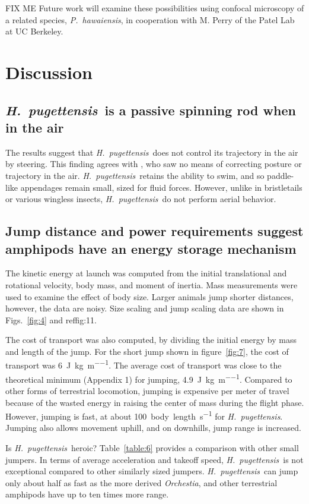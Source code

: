 \documentclass{article}
\newcommand{\Genus}[1]{\emph{#1}}
\newcommand{\Hyale}{\Genus{H.~pugettensis}}
\newcommand{\Parhyale}{\Genus{P.~hawaiensis}}
\begin{document}
FIX ME Future work will examine these possibilities using confocal microscopy of a related species, \Parhyale, in cooperation with M. Perry of the Patel Lab at UC Berkeley. 


\section*{Discussion}
\subsection*{\Hyale\ is a passive spinning rod when in the air}
	  The results suggest that \Hyale\ does not control its trajectory in the air by steering.  This finding agrees with \citet{Bracht:1980}, who saw no means of correcting posture or trajectory in the air.  \Hyale\ retains the ability to swim, and so paddle-like appendages remain small, sized for fluid forces.   However, unlike in bristletails or various wingless insects, \Hyale\ do not perform aerial behavior. 

\subsection*{Jump distance and power requirements suggest amphipods have an energy storage mechanism}
The kinetic energy at launch was computed from the initial translational and rotational velocity, body mass, and moment of inertia.  Mass measurements were used to examine the effect of body size.  Larger animals jump shorter distances, however, the data are noisy.  Size scaling and jump scaling data are shown in Figs.~\ref{fig:4} and ref{fig:11}.
	
The cost of transport was also computed, by dividing the initial energy by mass and length of the jump.  For the short jump shown in figure~\ref{fig:7}, the cost of transport was \SI{6}{\joule\per\kilo\gram\per\meter}.  The average cost of transport was close to the theoretical minimum (Appendix 1) for jumping, \SI{4.9}{\joule\per\kilo\gram\per\meter}.  Compared to other forms of terrestrial locomotion, jumping is expensive per meter of travel because of the wasted energy in raising the center of mass during the flight phase.  However, jumping is fast, at about \SI{100}{body length\per\second} for \Hyale.  Jumping also allows movement uphill, and on downhills, jump range is increased. 
	
Is \Hyale\ heroic?  Table~\ref{table:6} provides a comparison with other small jumpers.  In terms of average acceleration and takeoff speed, \Hyale\ is not exceptional compared to other similarly sized jumpers.  \Hyale\ can jump only about half as fast as the more derived \Genus{Orchestia}, and other terrestrial amphipods have up to ten times more range.  
\end{document}
